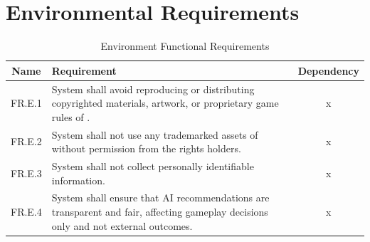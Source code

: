 \documentclass{article}
\begin{document}
\section*{Environmental Requirements}

\begin{table}[h!]
    \centering
    \begin{tabular}{|c|p{10cm}|c|}
    \hline
    \textbf{Name} & \textbf{Requirement} & \textbf{Dependency} \\
    \hline
    FR.E.1 & System shall avoid reproducing or distributing copyrighted materials, artwork, or proprietary game rules of \emph{\Catan{}}. & x \\
    \hline
    FR.E.2 & System shall not use any trademarked assets of \emph{\Catan{}} without permission from the rights holders. & x \\
    \hline
    FR.E.3 & System shall not collect personally identifiable information. & x \\
    \hline
    FR.E.4 & System shall ensure that AI recommendations are transparent and fair, affecting gameplay decisions only and not external outcomes. & x \\
    \hline
    \end{tabular}
    \caption{Environment Functional Requirements}
    \label{tab:fr}
\end{table}
\end{document}
